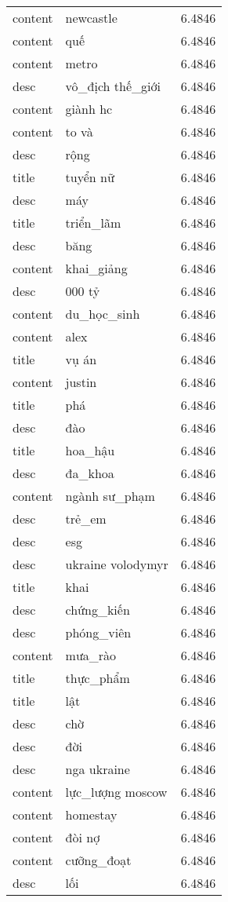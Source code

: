 \documentclass{article}
\begin{document}
\begin{tabular}{lll}
content & newcastle & 6.4846\\
content & quế & 6.4846\\
content & metro & 6.4846\\
desc & vô\_địch thế\_giới & 6.4846\\
content & giành hc & 6.4846\\
content & to và & 6.4846\\
desc & rộng & 6.4846\\
title & tuyển nữ & 6.4846\\
desc & máy & 6.4846\\
title & triển\_lãm & 6.4846\\
desc & băng & 6.4846\\
content & khai\_giảng & 6.4846\\
desc & 000 tỷ & 6.4846\\
content & du\_học\_sinh & 6.4846\\
content & alex & 6.4846\\
title & vụ án & 6.4846\\
content & justin & 6.4846\\
title & phá & 6.4846\\
desc & đào & 6.4846\\
title & hoa\_hậu & 6.4846\\
desc & đa\_khoa & 6.4846\\
content & ngành sư\_phạm & 6.4846\\
desc & trẻ\_em & 6.4846\\
desc & esg & 6.4846\\
desc & ukraine volodymyr & 6.4846\\
title & khai & 6.4846\\
desc & chứng\_kiến & 6.4846\\
desc & phóng\_viên & 6.4846\\
content & mưa\_rào & 6.4846\\
title & thực\_phẩm & 6.4846\\
title & lật & 6.4846\\
desc & chờ & 6.4846\\
desc & đời & 6.4846\\
desc & nga ukraine & 6.4846\\
content & lực\_lượng moscow & 6.4846\\
content & homestay & 6.4846\\
content & đòi nợ & 6.4846\\
content & cưỡng\_đoạt & 6.4846\\
desc & lối & 6.4846\\

\end{tabular}
\end{document}
